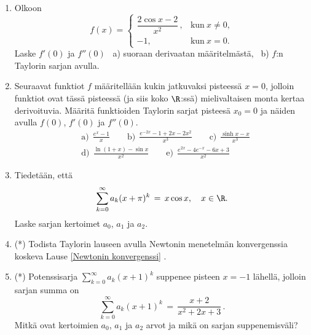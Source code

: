 \begin{enumerate}
\item
Olkoon
\[
f(x)= \begin{cases} 
      \dfrac{2\cos x-2}{x^2}\,, &\text{kun}\ x \neq 0, \\[2mm] -1, &\text{kun}\ x=0.
      \end{cases}
\]
Laske $f'(0)$ ja $f''(0)$ \ a) suoraan derivaatan määritelmästä, \ b) $f$:n Taylorin sarjan
avulla.

\item
Seuraavat funktiot $f$ määritellään kukin jatkuvaksi pisteessä $x=0$, jolloin funktiot ovat
tässä pisteessä (ja siis koko $\R$:ssä) mielivaltaisen monta kertaa derivoituvia. Määritä
funktioiden Taylorin sarjat pisteesä $x_0=0$ ja näiden avulla $f(0)$, $f'(0)$ ja $f''(0)$.
\begin{align*}
&\text{a)}\ \ \frac{e^x-1}{x} \qquad 
 \text{b)}\ \ \frac{e^{-2x}-1+2x-2x^2}{x^3} \qquad
 \text{c)}\ \ \frac{\sinh x-x}{x^3} \\
&\text{d)}\ \ \frac{\ln(1+x)-\sin x}{x^2} \qquad
 \text{e)}\ \ \frac{e^{2x}-4e^{-x}-6x+3}{x^2}
\end{align*}

\item
Tiedetään, että
\[
\sum_{k=0}^\infty a_k(x+\pi)^k\,=\,x\cos x, \quad x\in\R.
\]
Laske sarjan kertoimet $a_0$, $a_1$ ja $a_2$.

\item (*) \label{H-dif-4: Newtonin konvergenssi}
Todista Taylorin lauseen avulla Newtonin menetelmän konvergenssia koskeva Lause
\ref{Newtonin konvergenssi} .

\item (*) Potenssisarja $\sum_{k=0}^\infty a_k (x+1)^k$ suppenee pisteen $x=-1$ lähellä,
jolloin sarjan summa on
\[
\sum_{k=0}^\infty a_k (x+1)^k\,=\,\frac{x+2}{x^2+2x+3}\,.
\]
Mitkä ovat kertoimien $a_0$, $a_1$ ja $a_2$ arvot ja mikä on sarjan suppenemisväli?

\end{enumerate}